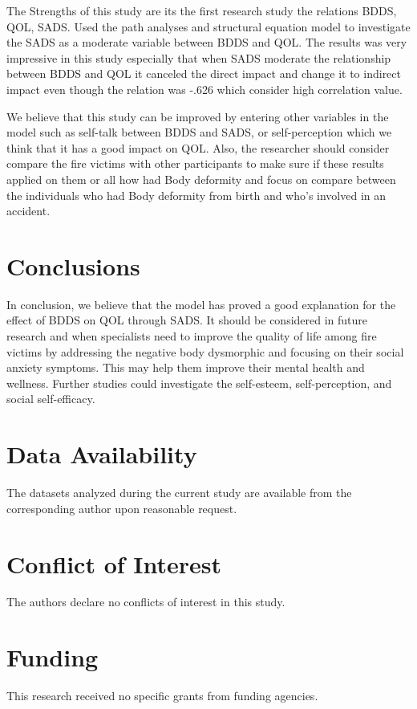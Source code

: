 \documentclass[10pt]{NSP1}
\begin{document}
	The Strengths of this study are its the first research study the relations BDDS, QOL, SADS. Used the path analyses and structural equation model to investigate the SADS as a moderate variable between BDDS and QOL. The results was very impressive in this study especially that when SADS moderate the relationship between BDDS and QOL it canceled the direct impact and change it to indirect impact even though the relation was -.626 which consider high correlation value.
	
	We believe that this study can be improved by entering other variables in the model such as self-talk between BDDS and SADS, or self-perception which we think that it has a good impact on QOL. Also, the researcher should consider compare the fire victims with other participants to make sure if these results applied on them or all how had Body deformity and focus on compare between the individuals who had Body deformity from birth and who's involved in an accident.
	
	\section{Conclusions}
	In conclusion, we believe that the model has proved a good explanation for the effect of BDDS on QOL through SADS. It should be considered in future research and when specialists need to improve the quality of life among fire victims by addressing the negative body dysmorphic and focusing on their social anxiety symptoms. This may help them improve their mental health and wellness. Further studies could investigate the self-esteem, self-perception, and social self-efficacy.
	
	\section*{Data Availability}
	The datasets analyzed during the current study are available from the corresponding author upon reasonable request.
	
	\section*{Conflict of Interest}
	The authors declare no conflicts of interest in this study.
	
	\section*{Funding}
	This research received no specific grants from funding agencies.
	
\end{document}
